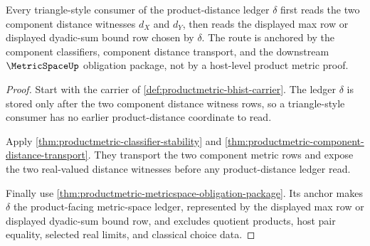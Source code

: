 \begin{theorem}
\label{thm:productmetric-distance-ledger-triangle-route}
Every triangle-style consumer of the product-distance ledger $\delta$ first reads the two component distance witnesses $d_X$ and $d_Y$, then reads the displayed max row or displayed dyadic-sum bound row chosen by $\delta$. The route is anchored by the component classifiers, component distance transport, and the downstream $\MetricSpaceUp$ obligation package, not by a host-level product metric proof.
\end{theorem}
\begin{proof}
Start with the carrier of \autoref{def:productmetric-bhist-carrier}. The ledger $\delta$ is stored only after the two component distance witness rows, so a triangle-style consumer has no earlier product-distance coordinate to read.

Apply \autoref{thm:productmetric-classifier-stability} and \autoref{thm:productmetric-component-distance-transport}. They transport the two component metric rows and expose the two real-valued distance witnesses before any product-distance ledger read.

Finally use \autoref{thm:productmetric-metricspace-obligation-package}. Its anchor makes $\delta$ the product-facing metric-space ledger, represented by the displayed max row or displayed dyadic-sum bound row, and excludes quotient products, host pair equality, selected real limits, and classical choice data.
\end{proof}

